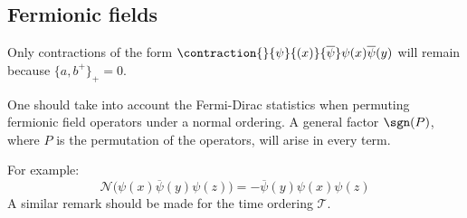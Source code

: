 \subsection{Fermionic fields}

	\begin{remark}
		Only contractions of the form $\contraction{}{\psi}{(x)}{\overline\psi}\psi(x)\overline\psi(y)$ will remain because $\{a, b^+\}_+ = 0$.
	\end{remark}
	
	
	\begin{remark}
		One should take into account the Fermi-Dirac statistics when permuting fermionic field operators under a normal ordering. A general factor $\sgn(P)$, where $P$ is the permutation of the operators, will arise in every term.
		
		For example: \[\mathcal{N}\Big(\psi(x)\overline\psi(y)\psi(z)\Big) = -\overline\psi(y)\psi(x)\psi(z)\]
		A similar remark should be made for the time ordering $\mathcal{T}$.
	\end{remark}
